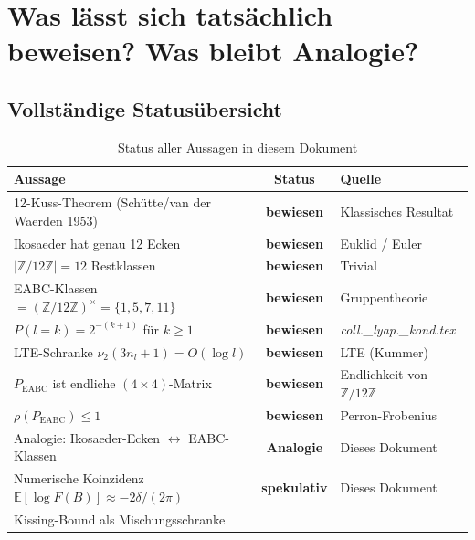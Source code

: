 \documentclass[12pt,a4paper]{article}
\newcommand{\vii}{\nu_2}
\newcommand{\Z}{\mathbb{Z}}
\newcommand{\E}{\mathbb{E}}
\newcommand{\logF}{\log F(B)}
\newcommand{\ZmZ}{\Z/12\Z}
\begin{document}
\section{Was lässt sich tatsächlich beweisen? Was bleibt Analogie?}
\label{sec:status}

\subsection{Vollständige Statusübersicht}

\begin{table}[h!]
\centering
\caption{Status aller Aussagen in diesem Dokument}
\label{tab:status}
\renewcommand{\arraystretch}{1.4}
\begin{tabular}{p{7.5cm} c p{4cm}}
\toprule
\textbf{Aussage} & \textbf{Status} & \textbf{Quelle} \\
\midrule
12-Kuss-Theorem (Schütte/van der Waerden 1953)
  & \textcolor{bewiesengrün}{\textbf{bewiesen}}
  & Klassisches Resultat \\
Ikosaeder hat genau 12 Ecken
  & \textcolor{bewiesengrün}{\textbf{bewiesen}}
  & Euklid / Euler \\
$|\ZmZ| = 12$ Restklassen
  & \textcolor{bewiesengrün}{\textbf{bewiesen}}
  & Trivial \\
EABC-Klassen $= (\Z/12\Z)^\times = \{1,5,7,11\}$
  & \textcolor{bewiesengrün}{\textbf{bewiesen}}
  & Gruppentheorie \\
$P(l = k) = 2^{-(k+1)}$ für $k \geq 1$
  & \textcolor{bewiesengrün}{\textbf{bewiesen}}
  & \textit{coll.\_lyap.\_kond.tex} \\
LTE-Schranke $\vii(3n_l+1) = O(\log l)$
  & \textcolor{bewiesengrün}{\textbf{bewiesen}}
  & LTE (Kummer) \\
$P_{\text{EABC}}$ ist endliche $(4 \times 4)$-Matrix
  & \textcolor{bewiesengrün}{\textbf{bewiesen}}
  & Endlichkeit von $\ZmZ$ \\
$\rho(P_{\text{EABC}}) \leq 1$
  & \textcolor{bewiesengrün}{\textbf{bewiesen}}
  & Perron-Frobenius \\
\midrule
Analogie: Ikosaeder-Ecken $\leftrightarrow$ EABC-Klassen
  & \textcolor{warnorange}{\textbf{Analogie}}
  & Dieses Dokument \\
Numerische Koinzidenz $\E[\logF] \approx -2\delta/(2\pi)$
  & \textcolor{warnorange}{\textbf{spekulativ}}
  & Dieses Dokument \\
Kissing-Bound als Mischungsschranke

\end{tabular}
\end{table}
\end{document}
